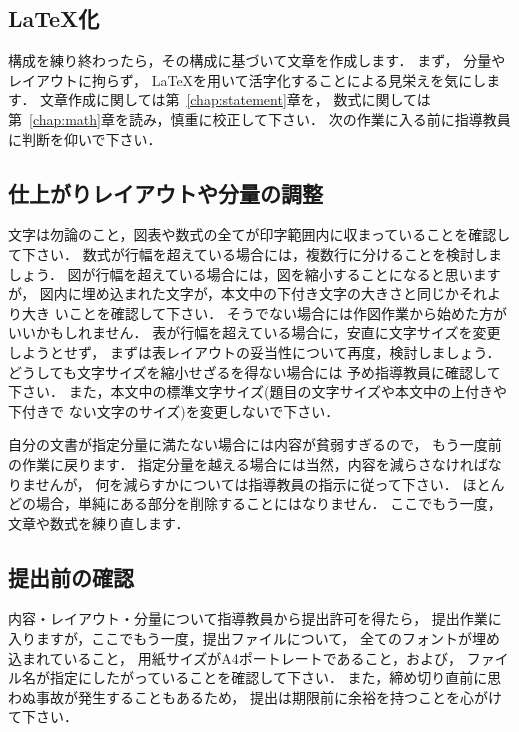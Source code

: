 \documentclass[a4j,12pt,dvipdfmx,oneside]{jsbook}
\theoremstyle{definition}
\begin{document}
\subsection{\LaTeX{}化}
構成を練り終わったら，その構成に基づいて文章を作成します．
まず，
分量やレイアウトに拘らず，
\LaTeX{}を用いて活字化することによる見栄えを気にします．
文章作成に関しては第~\ref{chap:statement}章を，
数式に関しては第~\ref{chap:math}章を読み，慎重に校正して下さい．
次の作業に入る前に指導教員に判断を仰いで下さい．
%
%
\subsection{仕上がりレイアウトや分量の調整}
文字は勿論のこと，図表や数式の全てが印字範囲内に収まっていることを確認し
て下さい．
数式が行幅を超えている場合には，複数行に分けることを検討しましょう．
図が行幅を超えている場合には，図を縮小することになると思いますが，
図内に埋め込まれた文字が，本文中の下付き文字の大きさと同じかそれより大き
いことを確認して下さい．
そうでない場合には作図作業から始めた方がいいかもしれません．
表が行幅を超えている場合に，安直に文字サイズを変更しようとせず，
まずは表レイアウトの妥当性について再度，検討しましょう．
どうしても文字サイズを縮小せざるを得ない場合には
予め指導教員に確認して下さい．
また，本文中の標準文字サイズ(題目の文字サイズや本文中の上付きや下付きで
ない文字のサイズ)を変更しないで下さい．

自分の文書が指定分量に満たない場合には内容が貧弱すぎるので，
もう一度前の作業に戻ります．
指定分量を越える場合には当然，内容を減らさなければなりませんが，
何を減らすかについては指導教員の指示に従って下さい．
ほとんどの場合，単純にある部分を削除することにはなりません．
ここでもう一度，文章や数式を練り直します．
%
%
%
\subsection{提出前の確認}
内容・レイアウト・分量について指導教員から提出許可を得たら，
提出作業に入りますが，ここでもう一度，提出ファイルについて，
全てのフォントが埋め込まれていること，
用紙サイズがA4ポートレートであること，および，
ファイル名が指定にしたがっていることを確認して下さい．
また，締め切り直前に思わぬ事故が発生することもあるため，
提出は期限前に余裕を持つことを心がけて下さい．
%
%
%
\end{document}
